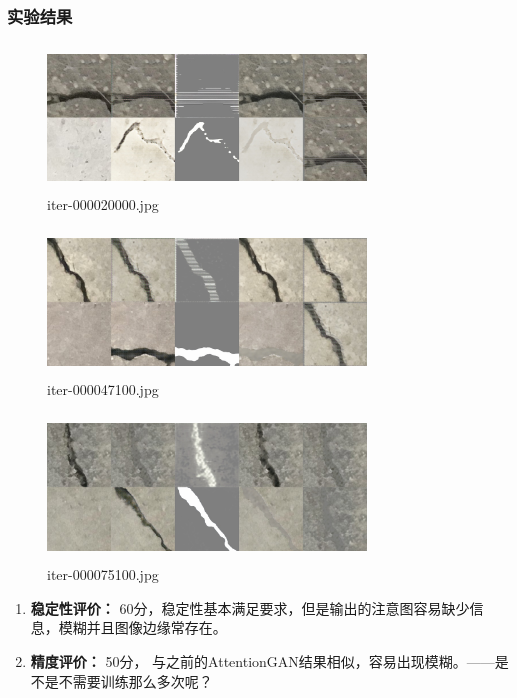 \subsubsection{实验结果}

\begin{figure}[H]
	\centering
	\includegraphics[width=240pt,height=110pt]{0320//iter-000020000}
	\caption{iter-000020000.jpg}
\end{figure}
\begin{figure}[H]
	\centering
	\includegraphics[width=240pt,height=110pt]{0320//iter-000047100}
	\caption{iter-000047100.jpg}
\end{figure}
\begin{figure}[H]
	\centering
	\includegraphics[width=240pt,height=110pt]{0320//iter-000075100}
	\caption{iter-000075100.jpg}
\end{figure}

\begin{enumerate}[1.]
	\item \textbf{稳定性评价：} 60分，稳定性基本满足要求，但是输出的注意图容易缺少信息，模糊并且图像边缘常存在。
	\item \textbf{精度评价：} 50分， 与之前的AttentionGAN结果相似，容易出现模糊。——是不是不需要训练那么多次呢？
\end{enumerate}


